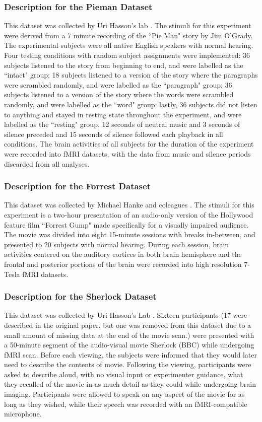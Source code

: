 \documentclass[11pt]{article}
\begin{document}
\subsubsection{Description for the Pieman Dataset}
This dataset was collected by Uri Hasson's lab \citep{hasson2016}. The stimuli for this experiment were derived from a 7 minute recording of the ``Pie Man" story by Jim O'Grady. The experimental subjects were all native English speakers with normal hearing. Four testing conditions with random subject assignments were implemented: 36 subjects listened to the story from beginning to end, and were labelled as the ``intact" group; 18 subjects listened to a version of the story where the paragraphs were scrambled randomly, and were labelled as the ``paragraph" group; 36 subjects listened to a version of the story where the words were scrambled randomly, and were labelled as the ``word" group; lastly, 36 subjects did not listen to anything and stayed in resting state throughout the experiment, and were labelled as the ``resting" group. 12 seconds of neutral music and 3 seconds of silence preceded and 15 seconds of silence followed each playback in all conditions. The brain activities of all subjects for the duration of the experiment were recorded into fMRI datasets, with the data from music and silence periods discarded from all analyses.

\subsubsection{Description for the Forrest Dataset}
This dataset was collected by Michael Hanke and coleagues \citep{Hanke2014}. The stimuli for this experiment is a two-hour presentation of an audio-only version of the Hollywood feature film ``Forrest Gump" made specifically for a visually impaired audience. The movie was divided into eight 15-minute sessions with breaks in-between, and presented to 20 subjects with normal hearing. During each session, brain activities centered on the auditory cortices in both brain hemisphere and the frontal and posterior portions of the brain were recorded into high resolution 7-Tesla fMRI datasets.

\subsubsection{Description for the Sherlock Dataset}
This dataset was collected by Uri Hasson's Lab \citep{Chen2017}. Sixteen participants (17 were described in the original paper, but one was removed from this dataset due to a small amount of missing data at the end of the movie scan.) were presented with a 50-minute segment of the audio-visual movie Sherlock (BBC) while undergoing fMRI scan. Before each viewing, the subjects were informed that they would later need to describe the contents of movie. Following the viewing, participants were asked to describe aloud, with no visual input or experimenter guidance, what they recalled of the movie in as much detail as they could while undergoing brain imaging. Participants were allowed to speak on any aspect of the movie for as long as they wished, while their speech was recorded with an fMRI-compatible microphone.
\end{document}
